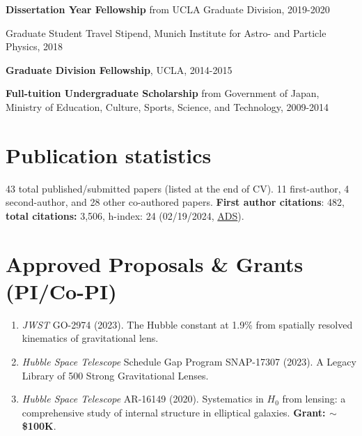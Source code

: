 \documentclass[margin, line]{res}
\begin{document}
\begin{resume}
\vspace*{-2.5mm}
\textbf{Dissertation Year Fellowship} from UCLA Graduate Division, 2019-2020%

\vspace*{-2.5mm}
Graduate Student Travel Stipend, {Munich Institute for Astro- and Particle Physics}, 2018%


\vspace*{-2.5mm}
\textbf{Graduate Division Fellowship}, UCLA, 2014-2015%

\vspace*{-2.5mm}
\textbf{Full-tuition Undergraduate Scholarship} from {Government of Japan, Ministry of Education, Culture, Sports, Science, and Technology}, 2009-2014%

\section{\sc Publication statistics} 43 total published/submitted papers (listed at the end of CV). {11 first-author}, {4 second-author, and 28 other co-authored} papers. \textbf{First author citations}: 482, \textbf{total citations:} 3,506, h-index: 24 (02/19/2024, \href{https://ui.adsabs.harvard.edu/user/libraries/NYgiA71JS4CR85Tt8CgJsw}{ADS}).
\vspace*{2.5mm}

\section{\sc Approved Proposals \& Grants (PI/Co-PI)}
\begin{enumerate}
	\item \textit{JWST} GO-2974 (2023). The Hubble constant at 1.9\% from spatially resolved kinematics of gravitational lens.
	\item \textit{Hubble Space Telescope} Schedule Gap Program SNAP-17307 (2023). A Legacy Library of 500 Strong Gravitational Lenses.
	\item \textit{Hubble Space Telescope} AR-16149 (2020). Systematics in $H_0$ from lensing: a comprehensive study of internal structure in elliptical galaxies. \textbf{Grant: $\sim$\$100K}.
\end{enumerate}


\end{resume}
\end{document}

